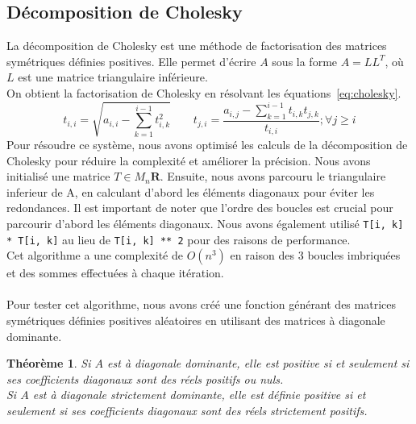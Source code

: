 \documentclass{article}
\newtheorem{theorem}{Théorème}
\begin{document}
\subsection{Décomposition de Cholesky}
\label{sec:cholesky}
La décomposition de Cholesky est une méthode de factorisation des matrices symétriques définies positives. Elle permet d'écrire \(A\) sous la forme \(A = LL^T\), où \(L\) est une matrice triangulaire inférieure.\\ 
On obtient la factorisation de Cholesky en résolvant les équations~\ref{eq:cholesky}.
\begin{equation}
t_{i,i} = \sqrt{a_{i,i} - \sum_{k=1}^{i-1} t_{i,k}^2} \quad \quad t_{j,i} = \frac{a_{i,j} - \sum_{k=1}^{i-1} t_{i,k} t_{j,k}}{t_{i,i}}; \forall j \geq i
\label{eq:cholesky}
\end{equation}
Pour résoudre ce système, nous avons optimisé les calculs de la décomposition de Cholesky pour réduire la complexité et améliorer la précision. Nous avons initialisé une matrice $T\in M_n\mathbf{R}$. Ensuite, nous avons parcouru le triangulaire inferieur de A, en calculant d'abord les éléments diagonaux pour éviter les redondances. Il est important de noter que l'ordre des boucles est crucial pour parcourir d'abord les éléments diagonaux. Nous avons également utilisé \texttt{T[i, k] * T[i, k]} au lieu de \texttt{T[i, k] ** 2} pour des raisons de performance. \\
Cet algorithme a une complexité de \(O(n^3)\) en raison des 3 boucles imbriquées et des sommes effectuées à chaque itération. \\ \\
Pour tester cet algorithme, nous avons créé une fonction générant des matrices symétriques définies positives aléatoires en utilisant des matrices à diagonale dominante.

\begin{theorem}
  \label{thm:diag_dominant}
  Si \( A \) est à diagonale dominante, elle est positive si et seulement si ses coefficients diagonaux sont des réels positifs ou nuls. \\Si \( A \) est à diagonale strictement dominante, elle est définie positive si et seulement si ses coefficients diagonaux sont des réels strictement positifs.
\end{theorem}
\end{document}
